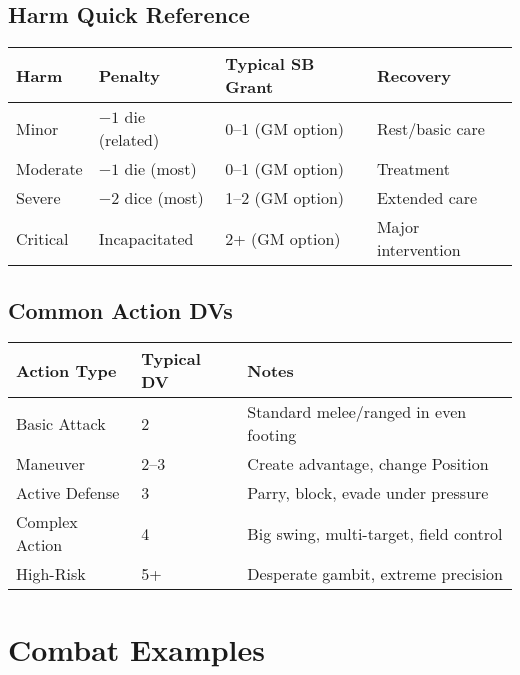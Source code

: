 \subsection{Harm Quick Reference}
\label{subsec:harm-quick-ref}

\begin{center}
\begin{tabular}{llll}
\toprule
\textbf{Harm} & \textbf{Penalty} & \textbf{Typical SB Grant} & \textbf{Recovery} \\
\midrule
Minor   & $-1$ die (related) & 0--1 (GM option) & Rest/basic care \\
Moderate& $-1$ die (most)    & 0--1 (GM option) & Treatment \\
Severe  & $-2$ dice (most)   & 1--2 (GM option) & Extended care \\
Critical& Incapacitated      & 2+ (GM option)   & Major intervention \\
\bottomrule
\end{tabular}
\end{center}

\subsection{Common Action DVs}
\label{subsec:action-dvs}

\begin{center}
\begin{tabular}{lll}
\toprule
\textbf{Action Type} & \textbf{Typical DV} & \textbf{Notes} \\
\midrule
Basic Attack    & 2   & Standard melee/ranged in even footing \\
Maneuver        & 2--3& Create advantage, change Position \\
Active Defense  & 3   & Parry, block, evade under pressure \\
Complex Action  & 4   & Big swing, multi-target, field control \\
High-Risk       & 5+  & Desperate gambit, extreme precision \\
\bottomrule
\end{tabular}
\end{center}

\section{Combat Examples}
\label{sec:combat-examples}

